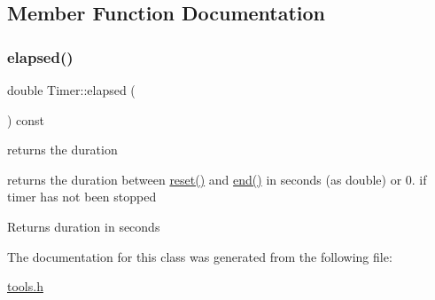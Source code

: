 \subsection{Member Function Documentation}
\mbox{\label{class_timer_a6a89a613c2af9b0d1e5f7e4ba9e46c54}} 
\subsubsection{\texorpdfstring{elapsed()}{elapsed()}}
{\footnotesize\ttfamily double Timer\+::elapsed (\begin{DoxyParamCaption}{ }\end{DoxyParamCaption}) const\hspace{0.3cm}{\ttfamily [inline]}}



returns the duration 

returns the duration between \hyperlink{class_timer_a9020542d73357a4eef512eefaf57524b}{reset()} and \hyperlink{class_timer_accef2f2b25869fbca2947a56b494d2a0}{end()} in seconds (as double) or 0. if timer has not been stopped \begin{DoxyReturn}{Returns}
duration in seconds 
\end{DoxyReturn}


The documentation for this class was generated from the following file\+:\begin{DoxyCompactItemize}
\item 
\hyperlink{tools_8h}{tools.\+h}\end{DoxyCompactItemize}
